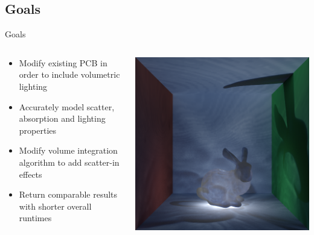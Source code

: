\documentclass[10pt,compress,professionalfont]{beamer}
\begin{document}
\subsection{Goals}
\begin{frame}{Goals}

    \begin{columns}
        \begin{column}{0.5\textwidth}

            \vspace{-4mm}
            \begin{itemize}
                \item Modify existing PCB in order to include volumetric lighting\\ \vspace{2mm}
                \item Accurately model scatter, absorption and lighting properties\\ \vspace{2mm}
                \item Modify volume integration algorithm to add scatter-in effects\\ \vspace{2mm}
                \item Return comparable results with shorter overall runtimes
            \end{itemize}
        \end{column}
        \begin{column}{0.5\textwidth}
            \includegraphics[width=\textwidth]{../img/bunny_glow}
        \end{column}
    \end{columns}

\end{frame}
\end{document}
